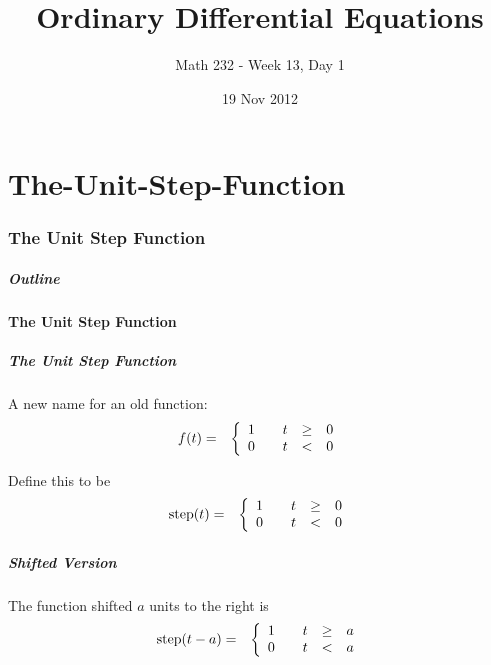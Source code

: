\part{The-Unit-Step-Function}
\section{The Unit Step Function}

\title{Ordinary Differential Equations}
\subtitle{Math 232 - Week 13, Day 1}
\date{19 Nov 2012}

\begin{frame}
  \titlepage
\end{frame}

\begin{frame}
  \frametitle{Outline}
\end{frame}


\subsection{The Unit Step Function}


\begin{frame}
  \frametitle{The Unit Step Function}

  A new name for an old function:
  \begin{eqnarray*}
    f(t) & = & 
    \left\{
      \begin{array}{r@{\hspace{2em}}rcl}
        1 & t & \geq & 0 \\
        0 & t & < & 0
      \end{array}
    \right.
  \end{eqnarray*}

  {
    Define this to be
    \begin{eqnarray*}
      \mathrm{step}(t) & = & 
      \left\{
        \begin{array}{r@{\hspace{2em}}rcl}
          1 & t & \geq & 0 \\
          0 & t & < & 0
        \end{array}
      \right.
    \end{eqnarray*}
  }

\end{frame}


\begin{frame}
  \frametitle{Shifted Version}

    The function shifted $a$ units to the right is
    \begin{eqnarray*}
      \mathrm{step}(t-a) & = & 
      \left\{
        \begin{array}{r@{\hspace{2em}}rcl}
          1 & t & \geq & a \\
          0 & t & < & a
        \end{array}
      \right.
    \end{eqnarray*}


\end{frame}

